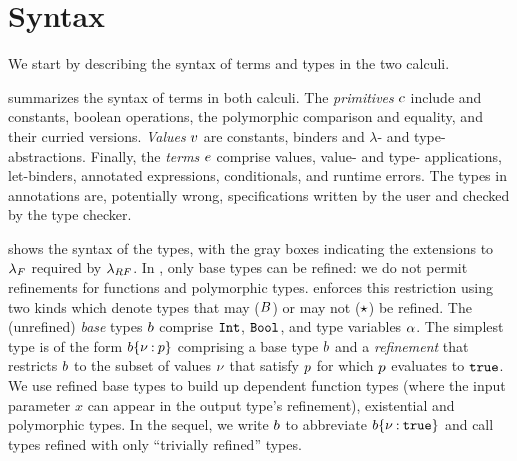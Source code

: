 \section{Syntax} \label{sec:lang:syntax}

We start by describing the syntax of terms and types 
in the two calculi.  

%
 summarizes the 
syntax of terms in both calculi.
%
%
The \emph{primitives} $c$
include \tint and \tbool constants, 
boolean operations, 
the polymorphic comparison and equality, 
and their curried versions.
%
%
\emph{Values} $v$ are 
constants, binders 
and $\lambda$- and type- abstractions.
%
Finally, the \emph{terms} $e$ comprise values,
value- and type- applications, let-binders, 
annotated expressions, conditionals, and runtime errors.
The types in annotations are, potentially wrong, specifications 
written by the user and checked by the type checker.  


%
 shows the syntax of the types,
with the gray boxes indicating the extensions to $\lambda_{F}$ 
required by $\lambda_{RF}$.
%
In \sysrf, only base types %
can be refined: we do not permit refinements 
for functions and polymorphic types. 
%
\sysrf enforces this restriction using two kinds
which denote types that may ($B$) or may not ($\star$)
be refined.
%
The (unrefined) \emph{base} types $b$ comprise 
$\texttt{Int}$, $\texttt{Bool}$, and type variables $\alpha$. 
%
The simplest type is of the form
${{b}\{\nu \mathbin{:} p\}}$ 
comprising a base type $b$ 
and a \emph{refinement} that restricts 
$b$ to the subset of values 
$\nu$ that satisfy $p$ \ie 
for which $p$ evaluates to $\mathtt{true}$.
%
We use refined base types to build up
dependent function types (where the input 
parameter $x$ can appear in the output type's 
refinement), existential and polymorphic 
types.
%
In the sequel, we write $b$ to abbreviate 
${{b}\{\nu \mathbin{:} \mathtt{true}\}}$
and call types refined with only \ttrue 
``trivially refined'' types. 

